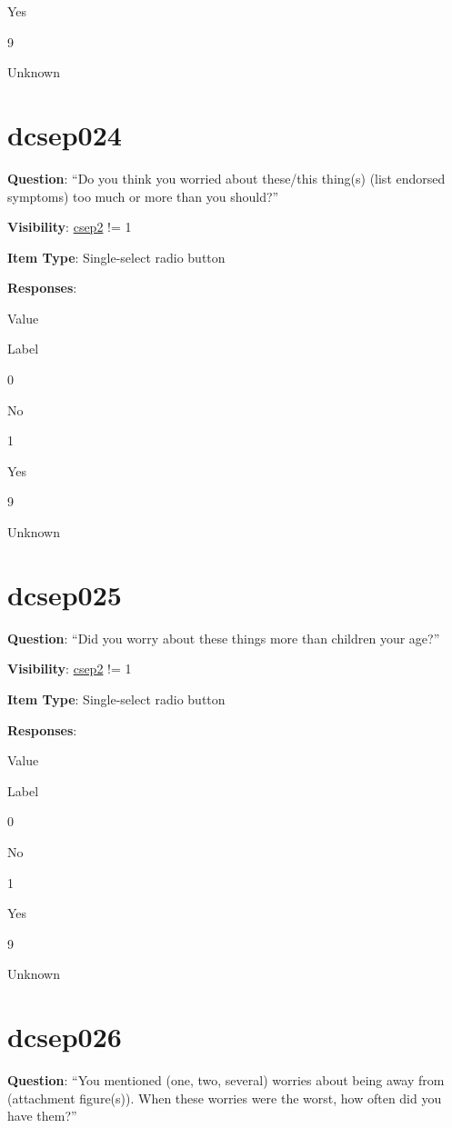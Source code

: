 \documentclass[]{book}
\begin{document}
Yes

9

Unknown

\hypertarget{dcsep024}{%
\section{dcsep024}\label{dcsep024}}

\textbf{Question}: ``Do you think you worried about these/this thing(s) (list endorsed symptoms) too much or more than you should?''

\textbf{Visibility}: \protect\hyperlink{csep2}{csep2} != 1

\textbf{Item Type}: Single-select radio button

\textbf{Responses}:

Value

Label

0

No

1

Yes

9

Unknown

\hypertarget{dcsep025}{%
\section{dcsep025}\label{dcsep025}}

\textbf{Question}: ``Did you worry about these things more than children your age?''

\textbf{Visibility}: \protect\hyperlink{csep2}{csep2} != 1

\textbf{Item Type}: Single-select radio button

\textbf{Responses}:

Value

Label

0

No

1

Yes

9

Unknown

\hypertarget{dcsep026}{%
\section{dcsep026}\label{dcsep026}}

\textbf{Question}: ``You mentioned (one, two, several) worries about being away from (attachment figure(s)). When these worries were the worst, how often did you have them?''
\end{document}
